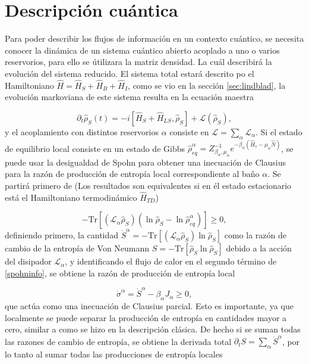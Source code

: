\section{Descripción cuántica}
Para poder describir los flujos de información en un contexto cuántico, se necesita conocer la dinámica de un sistema cuántico abierto acoplado a uno o varios reservorios, para ello se útilizara la matriz densidad. La cuál describirá la evolución del sistema reducido. El sistema total estará descrito po el Hamiltoniano $\hat{H} = \hat{H}_{S}+\hat{H}_{B}+ \hat{H}_{I}$, como se vio en la sección \ref{sec:lindblad}, la evolución markoviana de este sistema resulta en la ecuación maestra

\begin{equation*}
    \partial_{t}\hat{\rho}_{S}(t) = - i[\hat{H}_{S} + \hat{H}_{LS},\hat{\rho}_{S}] + \mathcal{L}(\hat{\rho}_{S}),
\end{equation*}
y el acoplamiento con distintos reservorios $\alpha$ consiste en $\mathcal{L} = \sum_{\alpha}\mathcal{L}_{\alpha}$. Si el estado de equilibrio local consiste en un estado de Gibbs $\hat{\rho}_{eq}^{\alpha} = Z_{\beta_{\alpha},\mu_{\alpha}}^{-1}e^{-\beta_{\alpha}(\hat{H}_{s} - \mu_{\alpha}\hat{N})}$, se puede usar la desigualdad de Spohn \cite{spohn1978entropy} para  obtener una inecuación de Clausius para la razón de producción de entropía local correspondiente al baño $\alpha$. Se partirá primero de (Los resultados son equivalentes si en él estado estacionario está el Hamiltoniano termodinámico $\hat{H}_{TD}$)

\begin{equation}
    - \text{Tr}[ (\mathcal{L}_{\alpha} \hat{\rho}_{S})(\ln \hat{\rho}_{S} - \ln \hat{\rho}^{\alpha}_{eq} )  ] \geq 0,
\label{spohninfo}
\end{equation}
definiendo primero, la cantidad $\dot{S}^{\alpha} = - \text{Tr}[(\mathcal{L}_{\alpha}\hat{\rho}_{S}) \ln \hat{\rho}_{S} ]$ como la razón de cambio de la entropía de Von Neumann $S = - \text{Tr}[\hat{\rho}_{S} \ln \hat{\rho}_{S} ]$ debido a la acción del disipador $\mathcal{L}_{\alpha}$, y identificando el flujo de calor en el segundo término de \ref{spohninfo}, se obtiene la razón de producción de entropía local

\begin{equation}
    \dot{\sigma}^{\alpha} = \dot{S}^{\alpha} - \beta_{\alpha} J_{\alpha} \geq 0,
\label{sec4:localentropy}
\end{equation}
que actúa como una inecuación de Clausius parcial. Esto es importante, ya que localmente se puede separar la producción de entropía en cantidades mayor a cero, similar a como se hizo en la descripción clásica. De hecho si se suman todas las razones de cambio de entropía, se obtiene la derivada total $\partial_{t} S = \sum_{\alpha} \dot{S}^{\alpha}$, por lo tanto al sumar todas las producciones de entropía locales

